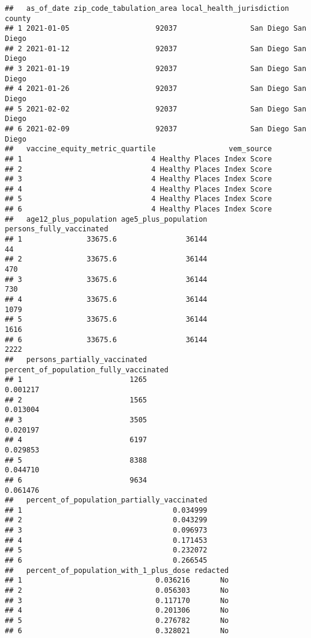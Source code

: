 \documentclass[
]{article}
\begin{document}
\begin{verbatim}
##   as_of_date zip_code_tabulation_area local_health_jurisdiction    county
## 1 2021-01-05                    92037                 San Diego San Diego
## 2 2021-01-12                    92037                 San Diego San Diego
## 3 2021-01-19                    92037                 San Diego San Diego
## 4 2021-01-26                    92037                 San Diego San Diego
## 5 2021-02-02                    92037                 San Diego San Diego
## 6 2021-02-09                    92037                 San Diego San Diego
##   vaccine_equity_metric_quartile                 vem_source
## 1                              4 Healthy Places Index Score
## 2                              4 Healthy Places Index Score
## 3                              4 Healthy Places Index Score
## 4                              4 Healthy Places Index Score
## 5                              4 Healthy Places Index Score
## 6                              4 Healthy Places Index Score
##   age12_plus_population age5_plus_population persons_fully_vaccinated
## 1               33675.6                36144                       44
## 2               33675.6                36144                      470
## 3               33675.6                36144                      730
## 4               33675.6                36144                     1079
## 5               33675.6                36144                     1616
## 6               33675.6                36144                     2222
##   persons_partially_vaccinated percent_of_population_fully_vaccinated
## 1                         1265                               0.001217
## 2                         1565                               0.013004
## 3                         3505                               0.020197
## 4                         6197                               0.029853
## 5                         8388                               0.044710
## 6                         9634                               0.061476
##   percent_of_population_partially_vaccinated
## 1                                   0.034999
## 2                                   0.043299
## 3                                   0.096973
## 4                                   0.171453
## 5                                   0.232072
## 6                                   0.266545
##   percent_of_population_with_1_plus_dose redacted
## 1                               0.036216       No
## 2                               0.056303       No
## 3                               0.117170       No
## 4                               0.201306       No
## 5                               0.276782       No
## 6                               0.328021       No
\end{verbatim}
\end{document}
